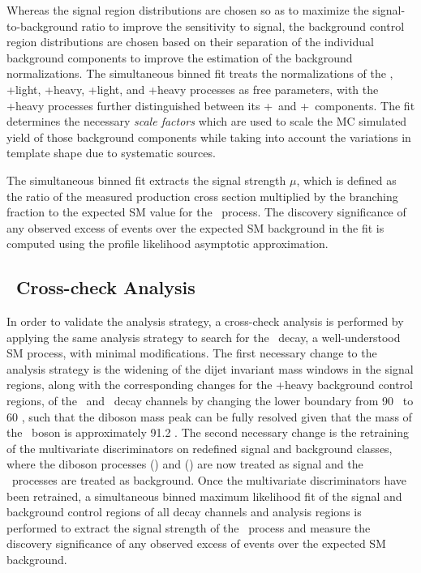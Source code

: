 Whereas the signal region distributions are chosen so as to maximize the signal-to-background ratio to improve the sensitivity to signal, the background control region distributions are chosen based on their separation of the individual background components to improve the estimation of the background normalizations. The simultaneous binned fit treats the normalizations of the \qrkt\qrktbar, \bosW+light, \bosW+heavy, \bosZ+light, and \bosZ+heavy processes as free parameters, with the \bosV+heavy processes further distinguished between its \bosV+\qrkb\ and \bosV+\qrkb\qrkbbar\ components. The fit determines the necessary \textit{scale factors} which are used to scale the MC simulated yield of those background components while taking into account the variations in template shape due to systematic sources.

The simultaneous binned fit extracts the signal strength $\mu$, which is defined as the ratio of the measured production cross section multiplied by the branching fraction to the expected SM value for the \VHbb\ process. The discovery significance of any observed excess of events over the expected SM background in the fit is computed using the profile likelihood asymptotic approximation.\cite{FITRES1, FITRES2, FITRES3, FITRES4}

\subsection{\VZbb\ Cross-check Analysis}

In order to validate the analysis strategy, a cross-check analysis is performed by applying the same analysis strategy to search for the \VZbb\ decay, a well-understood SM process, with minimal modifications. The first necessary change to the analysis strategy is the widening of the dijet invariant mass windows in the signal regions, along with the corresponding changes for the \bosV+heavy background control regions, of the \WlnH\ and \ZllH\ decay channels by changing the lower boundary from 90 \GeV\ to 60 \GeV, such that the diboson mass peak can be fully resolved given that the mass of the \bosZ\ boson is approximately 91.2 \GeV. The second necessary change is the retraining of the multivariate discriminators on redefined signal and background classes, where the diboson processes \bosW\bosZ(\qrkb\qrkbbar) and \bosZ\bosZ(\qrkb\qrkbbar) are now treated as signal and the \VHbb\ processes are treated as background. Once the multivariate discriminators have been retrained, a simultaneous binned maximum likelihood fit of the signal and background control regions of all decay channels and analysis regions is performed to extract the signal strength of the \VZbb\ process and measure the discovery significance of any observed excess of events over the expected SM background.

